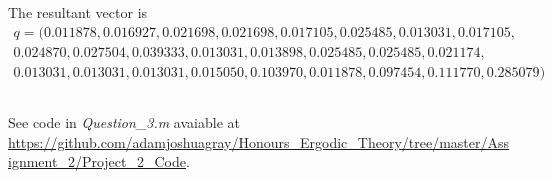 \documentclass{unswmaths}
\begin{document}
The resultant vector is
\begin{align*}    q =
(  0.011878,
   0.016927,
   0.021698,
   0.021698,
   0.017105,
   0.025485,
   0.013031,
   0.017105, \\
   0.024870,
   0.027504,
   0.039333,
   0.013031,
   0.013898,
   0.025485,
   0.025485,
   0.021174, \\
   0.013031,
   0.013031,
   0.013031,
   0.015050,
   0.103970,
   0.011878,
   0.097454,
   0.111770,
   0.285079
)
\end{align*}
\subsection{}
See code in \emph{Question\_3.m} avaiable at \url{https://github.com/adamjoshuagray/Honours_Ergodic_Theory/tree/master/Assignment_2/Project_2_Code}. 
\end{document}

